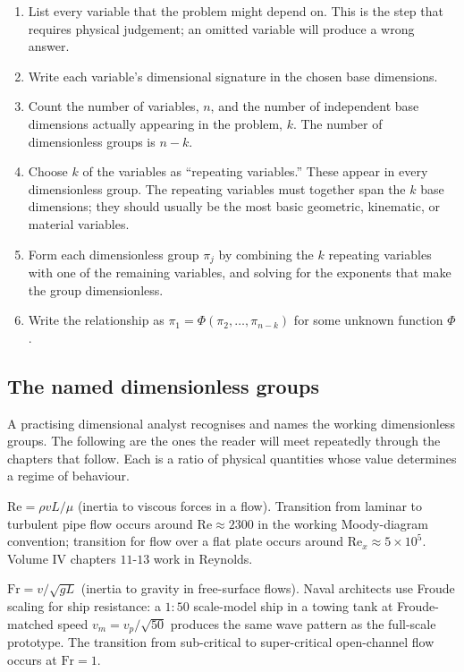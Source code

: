 \begin{enumerate}[leftmargin=*]
  \item List every variable that the problem might depend on. This is
    the step that requires physical judgement; an omitted variable
    will produce a wrong answer.
  \item Write each variable's dimensional signature in the chosen
    base dimensions.
  \item Count the number of variables, $n$, and the number of
    independent base dimensions actually appearing in the problem,
    $k$. The number of dimensionless groups is $n - k$.
  \item Choose $k$ of the variables as ``repeating variables.'' These
    appear in every dimensionless group. The repeating variables must
    together span the $k$ base dimensions; they should usually be the
    most basic geometric, kinematic, or material variables.
  \item Form each dimensionless group $\pi_{j}$ by combining the
    $k$ repeating variables with one of the remaining variables, and
    solving for the exponents that make the group dimensionless.
  \item Write the relationship as $\pi_{1} = \Phi(\pi_{2}, \ldots,
    \pi_{n-k})$ for some unknown function $\Phi$.
\end{enumerate}

\subsection{The named dimensionless groups}

A practising dimensional analyst recognises and names the working
dimensionless groups. The following are the ones the reader will
meet repeatedly through the chapters that follow. Each is a ratio
of physical quantities whose value determines a regime of
behaviour.

 $\mathrm{Re} = \rho v L/\mu$ (inertia to
viscous forces in a flow). Transition from laminar to turbulent
pipe flow occurs around $\mathrm{Re} \approx 2300$ in the working
Moody-diagram convention; transition for flow over a flat plate
occurs around $\mathrm{Re}_{x} \approx 5 \times 10^{5}$. Volume IV
chapters $11$-$13$ work in Reynolds.

 $\mathrm{Fr} = v/\sqrt{gL}$ (inertia to
gravity in free-surface flows). Naval architects use Froude scaling
for ship resistance: a $1{:}50$ scale-model ship in a towing tank
at Froude-matched speed $v_{m} = v_{p}/\sqrt{50}$ produces the
same wave pattern as the full-scale prototype. The transition from
sub-critical to super-critical open-channel flow occurs at
$\mathrm{Fr} = 1$.

